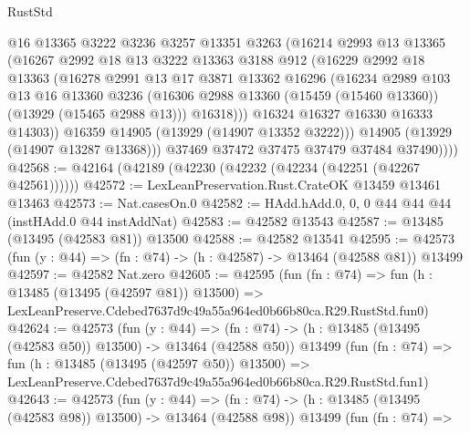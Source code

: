 \begin{lexlean}{RustStd}
\begin{coremodule}
                @16
                @13365
                @3222
                @3236
                @3257
                @13351
                @3263
                (@16214
                  @2993
                  @13
                  @13365
                  (@16267
                    @2992
                    @18
                    @13
                    @3222
                    @13363
                    @3188
                    @912
                    (@16229
                      @2992
                      @18
                      @13363
                      (@16278
                        @2991
                        @13
                        @17
                        @3871
                        @13362
                        @16296
                        (@16234
                          @2989
                          @103
                          @13
                          @16
                          @13360
                          @3236
                          (@16306 @2988 @13360 (@15459 (@15460 @13360)) (@13929 (@15465 @2988 @13)))
                          @16318)))
                    @16324
                    @16327
                    @16330
                    @16333
                    @14303))
                @16359
                @14905
                (@13929 (@14907 @13352 @3222)))
              @14905
              (@13929 (@14907 @13287 @13368)))
            @37469
            @37472
            @37475
            @37479
            @37484
            @37490))))
@42568 := @42164 (@42189 (@42230 (@42232 (@42234 (@42251 (@42267 @42561))))))
@42572 := LexLeanPreservation.Rust.CrateOK @13459 @13461 @13463
@42573 := Nat.casesOn.{0}
@42582 := HAdd.hAdd.{0, 0, 0} @44 @44 @44 (instHAdd.{0} @44 instAddNat)
@42583 := @42582 @13543
@42587 := @13485 (@13495 (@42583 @81)) @13500
@42588 := @42582 @13541
@42595 := @42573 (fun (y : @44) => (fn : @74) -> (h : @42587) -> @13464 (@42588 @81)) @13499
@42597 := @42582 Nat.zero
@42605 := @42595
    (fun (fn : @74) =>
    fun (h : @13485 (@13495 (@42597 @81)) @13500) =>
    LexLeanPreserve.Cdebed7637d9c49a55a964ed0b66b80ca.R29.RustStd.fun0)
@42624 := @42573
    (fun (y : @44) =>
    (fn : @74) -> (h : @13485 (@13495 (@42583 @50)) @13500) -> @13464 (@42588 @50))
    @13499
    (fun (fn : @74) =>
    fun (h : @13485 (@13495 (@42597 @50)) @13500) =>
    LexLeanPreserve.Cdebed7637d9c49a55a964ed0b66b80ca.R29.RustStd.fun1)
@42643 := @42573
    (fun (y : @44) =>
    (fn : @74) -> (h : @13485 (@13495 (@42583 @98)) @13500) -> @13464 (@42588 @98))
    @13499
    (fun (fn : @74) =>

\end{coremodule}
\end{lexlean}
